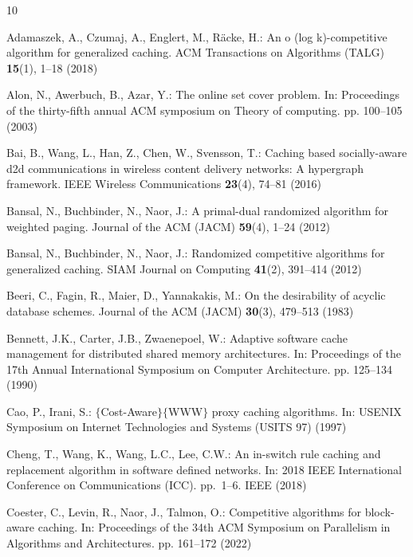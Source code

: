 \documentclass[11pt]{article}
\begin{document}

\begin{thebibliography}{10}
\providecommand{\url}[1]{\texttt{#1}}
\providecommand{\urlprefix}{URL }
\providecommand{\doi}[1]{https://doi.org/#1}

Adamaszek, A., Czumaj, A., Englert, M., R{\"a}cke, H.: An o (log k)-competitive
  algorithm for generalized caching. ACM Transactions on Algorithms (TALG)
  \textbf{15}(1),  1--18 (2018)

Alon, N., Awerbuch, B., Azar, Y.: The online set cover problem. In: Proceedings
  of the thirty-fifth annual ACM symposium on Theory of computing. pp. 100--105
  (2003)

Bai, B., Wang, L., Han, Z., Chen, W., Svensson, T.: Caching based
  socially-aware d2d communications in wireless content delivery networks: A
  hypergraph framework. IEEE Wireless Communications  \textbf{23}(4),  74--81
  (2016)

Bansal, N., Buchbinder, N., Naor, J.: A primal-dual randomized algorithm for
  weighted paging. Journal of the ACM (JACM)  \textbf{59}(4),  1--24 (2012)

Bansal, N., Buchbinder, N., Naor, J.: Randomized competitive algorithms for
  generalized caching. SIAM Journal on Computing  \textbf{41}(2),  391--414
  (2012)

Beeri, C., Fagin, R., Maier, D., Yannakakis, M.: On the desirability of acyclic
  database schemes. Journal of the ACM (JACM)  \textbf{30}(3),  479--513 (1983)

Bennett, J.K., Carter, J.B., Zwaenepoel, W.: Adaptive software cache management
  for distributed shared memory architectures. In: Proceedings of the 17th
  Annual International Symposium on Computer Architecture. pp. 125--134 (1990)

Cao, P., Irani, S.: $\{$Cost-Aware$\}$$\{$WWW$\}$ proxy caching algorithms. In:
  USENIX Symposium on Internet Technologies and Systems (USITS 97) (1997)

Cheng, T., Wang, K., Wang, L.C., Lee, C.W.: An in-switch rule caching and
  replacement algorithm in software defined networks. In: 2018 IEEE
  International Conference on Communications (ICC). pp.~1--6. IEEE (2018)

Coester, C., Levin, R., Naor, J., Talmon, O.: Competitive algorithms for
  block-aware caching. In: Proceedings of the 34th ACM Symposium on Parallelism
  in Algorithms and Architectures. pp. 161--172 (2022)


\end{thebibliography}
\end{document}
